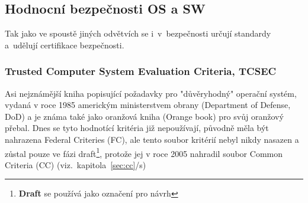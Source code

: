 \documentclass[a4paper,12pt]{article}
\newcommand{\odkazNaKapitolu}[1]{(viz.~kapitola~\ref{#1}/s\pageref{#1})}
\renewcommand{\b}[1]{\textbf{#1}} %
\begin{document}
\subsection{Hodnocní bezpečnosti OS a SW}

Tak jako ve spoustě jiných odvětvích se i~v~bezpečnosti určují standardy a~udělují certifikace bezpečnosti.

\subsubsection{Trusted Computer System Evaluation Criteria, TCSEC} \label{sec:TCSEC}

Asi nejznámější kniha popisující požadavky pro "důvěryhodný" operační systém, vydaná v roce 1985 americkým ministerstvem obrany (Department of Defense, DoD) a je známa také jako oranžová kniha (Orange book) pro svůj oranžový přebal. Dnes se tyto hodnotící kritéria již nepoužívají, původně měla být nahrazena Federal Criteries (FC), ale tento soubor kritérií nebyl nikdy nasazen a zůstal pouze ve fázi draft\footnote{\b{Draft} se používá jako označení pro návrh}, protože jej v roce 2005 nahradil soubor Common Criteria (CC) \odkazNaKapitolu{sec:cc}\\
\end{document}
